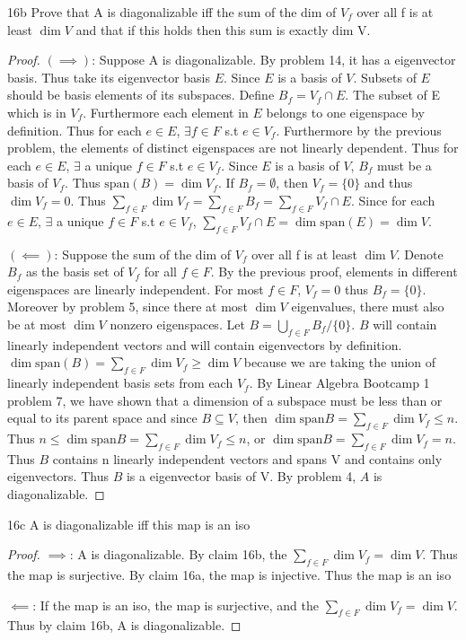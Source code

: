 \documentclass{article}
\begin{document}
\begin{claim}{16b}\label{Claim 16b.}
    Prove that A is diagonalizable iff the sum of the dim of $V_f$ over all f is at least $\dim V$  and that if this holds then this sum is exactly dim V. 
\end{claim}
\begin{proof}
    $(\implies)$: Suppose A is diagonalizable. By problem 14, it has a eigenvector basis. Thus take its eigenvector basis $E$. Since $E$ is a basis of $V$. Subsets of $E$ should be basis elements of its subspaces. Define $B_f = V_f \cap E$. The subset of E which is in $V_f$. Furthermore each element in $E$ belongs to one eigenspace by definition. Thus for each $e \in E$, $\exists f \in F$ s.t $e \in V_f$. Furthermore by the previous problem, the elements of distinct eigenspaces are not linearly dependent. Thus for each $e \in E$, $\exists$ a unique $f \in F$ s.t $e \in V_f$. Since $E$ is a basis of $V$, $B_f$ must be a basis of $V_f$. Thus $\mathrm{span}(B) = \dim V_f$. If $B_f = \emptyset$, then $V_f = \{0\}$ and thus $\dim V_f = 0$. Thus $\sum_{f \in F} \dim V_f = \sum_{f \in F}B_f = \sum_{f \in F} V_f \cap E$. Since for each $e \in E$, $\exists$ a unique $f \in F$ s.t $e \in V_f$, $\sum_{f \in F} V_f \cap E = \dim \mathrm{span}(E) = \dim V$.

    $(\impliedby)$: Suppose the sum of the dim of $V_f$ over all f is at least $\dim V$. Denote $B_{f}$ as the basis set of $V_f$ for all $f \in F$. By the previous proof, elements in different eigenspaces are linearly independent. For most $f \in F$, $V_{f} = {0}$ thus $B_f = \{0\}$. Moreover by problem 5, since there at most $\dim V$ eigenvalues, there must also be at most $\dim V$ nonzero eigenspaces. Let $B = \bigcup_{f \in F}B_f/\{0\}$. $B$ will contain linearly independent vectors and will contain eigenvectors by definition. $\dim \mathrm{span}(B) = \sum_{f\in F}\dim V_f \geq \dim V$ because we are taking the union of linearly independent basis sets from each $V_f$. By Linear Algebra Bootcamp 1 problem 7, we have shown that a dimension of a subspace must be less than or equal to its parent space and since $B \subseteq V$, then $\dim \mathrm{span} B = \sum_{f\in F}\dim V_f \leq n $. Thus $n \leq \dim \mathrm{span} B = \sum_{f\in F}\dim V_f \leq n$, or $\dim \mathrm{span} B = \sum_{f\in F}\dim V_f = n$. Thus $B$ contains n linearly independent vectors and spans V and contains only eigenvectors. Thus $B$ is a eigenvector basis of V. By problem 4, $A$ is diagonalizable.
\end{proof}

\begin{claim}{16c}\label{Claim 16c.}
    A is diagonalizable iff this map is an iso
\end{claim}
\begin{proof}
    $\implies$: A is diagonalizable. By claim 16b, the $\sum_{f \in F}^{} \dim V_f = \dim V$. Thus the map is surjective. By claim 16a, the map is injective. Thus the map is an iso
    
    $\impliedby$: If the map is an iso, the map is surjective, and the $\sum_{f \in F}^{} \dim V_f = \dim V$. Thus by claim 16b, A is diagonalizable.
\end{proof}
\end{document}
